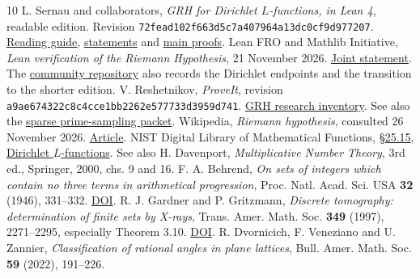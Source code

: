 \documentclass[11pt,letterpaper]{article}
\newcommand{\heading}[1]{\medskip\noindent{\large\bfseries\color{ink}#1}\par}
\begin{document}
\newpage
\heading{References and source revisions}
\begingroup\small
\renewcommand{\refname}{}
\vspace{-2.0em}
\begin{thebibliography}{10}
\setlength{\itemsep}{5pt}
 L. Sernau and collaborators, \emph{GRH for Dirichlet \(L\)-functions, in Lean 4}, readable edition. Revision
\texttt{72fead102f663d5c7a407964a13dc0cf9d977207}.
\href{https://github.com/lsernau/grh-lean/blob/72fead102f663d5c7a407964a13dc0cf9d977207/grh/GUIDE.md}{Reading guide},
\href{https://github.com/lsernau/grh-lean/blob/72fead102f663d5c7a407964a13dc0cf9d977207/grh/src/Statements.lean}{statements} and
\href{https://github.com/lsernau/grh-lean/blob/72fead102f663d5c7a407964a13dc0cf9d977207/grh/src/Main.lean}{main proofs}.
 Lean FRO and Mathlib Initiative, \emph{Lean verification of the Riemann Hypothesis}, 21 November 2026.
\href{https://leanprover-community.github.io/blog/posts/riemann-hypothesis/}{Joint statement}.
The \href{https://github.com/leanprover-community/riemann-hypothesis}{community repository} also records the Dirichlet endpoints and the transition to the shorter edition.
 V. Reshetnikov, \emph{ProveIt}, revision
\texttt{a9ae674322c8c4cce1bb2262e577733d3959d741}.
\href{https://github.com/VladimirReshetnikov/ProveIt/tree/a9ae674322c8c4cce1bb2262e577733d3959d741/Analysis/GeneralizedRiemannHypothesis}{GRH research inventory}.
See also the \href{https://github.com/VladimirReshetnikov/ProveIt/tree/a9ae674322c8c4cce1bb2262e577733d3959d741/Analysis/GeneralizedRiemannHypothesis/Research/grh-torsion-and-prime-sampling}{sparse prime-sampling packet}.
 Wikipedia, \emph{Riemann hypothesis}, consulted 26 November 2026.
\href{https://en.wikipedia.org/wiki/Riemann_hypothesis}{Article}.
 NIST Digital Library of Mathematical Functions,
\href{https://dlmf.nist.gov/25.15}{\S25.15, Dirichlet \(L\)-functions}.
See also H. Davenport, \emph{Multiplicative Number Theory}, 3rd ed., Springer, 2000, chs. 9 and 16.
 F. A. Behrend, \emph{On sets of integers which contain no three terms in arithmetical progression}, Proc. Natl. Acad. Sci. USA \textbf{32} (1946), 331--332.
\href{https://doi.org/10.1073/pnas.32.12.331}{DOI}.
 R. J. Gardner and P. Gritzmann, \emph{Discrete tomography: determination of finite sets by X-rays}, Trans. Amer. Math. Soc. \textbf{349} (1997), 2271--2295, especially Theorem 3.10.
\href{https://doi.org/10.1090/S0002-9947-97-01741-8}{DOI}.
 R. Dvornicich, F. Veneziano and U. Zannier, \emph{Classification of rational angles in plane lattices}, Bull. Amer. Math. Soc. \textbf{59} (2022), 191--226.

\end{thebibliography}
\end{document}
